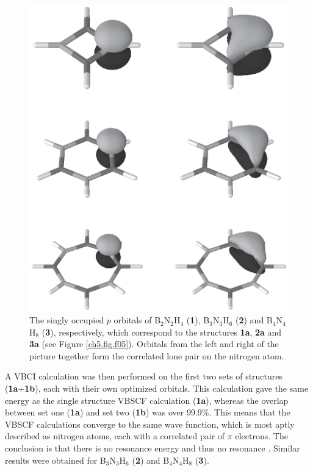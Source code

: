 \begin{figure}
\begin{center}
\includegraphics{huckel/figures/fig6.eps}
\end{center}
\caption{The singly occupied $p$ orbitals of B$_2$N$_2$H$_4$ (\textbf{1}), B$_3$N$_3$H$_6$ (\textbf{2}) and B$_4$N$_4$H$_8$ (\textbf{3}), respectively,
which correspond to the structures \textbf{1a}, \textbf{2a} and \textbf{3a} (see Figure \ref{ch5.fig.f05}). Orbitals from the left and right of the picture together
form the correlated lone pair on the nitrogen atom.}
\label{ch5.fig.f06}
\end{figure}

A VBCI calculation was then performed on the first two sets of structures (\textbf{1a}+\textbf{1b}), each with their own optimized
orbitals. This calculation gave the same energy as the single structure VBSCF calculation (\textbf{1a}), whereas the overlap between
set one (\textbf{1a}) and set two (\textbf{1b}) was over 99.9\%. This means that the VBSCF calculations converge to the same
wave function, which is most aptly described as nitrogen atoms, each with a correlated pair of $\pi$ electrons. The conclusion
is that there is no resonance energy and thus no resonance \cite{r37}. Similar results were obtained for B$_3$N$_3$H$_6$ (\textbf{2}) \cite{r37}
and B$_4$N$_4$H$_8$ (\textbf{3}).

